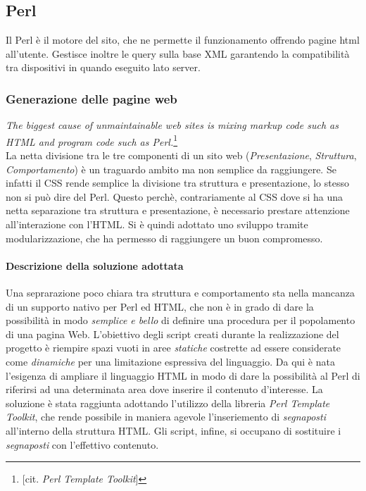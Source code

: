 \subsection{Perl}
Il Perl \`e il motore del sito, che ne permette il funzionamento offrendo pagine html all'utente. Gestisce inoltre le query sulla base XML garantendo la compatibilit\`a tra dispositivi in quando eseguito lato server.
\subsubsection{Generazione delle pagine web}
\textit{The biggest cause of unmaintainable web sites is mixing markup code such as HTML and program code such as Perl.}\footnote{[cit. \textit{Perl Template Toolkit}]}\\

La netta divisione tra le tre componenti di un sito web (\textit{Presentazione}, \textit{Struttura}, \textit{Comportamento}) \`e un traguardo ambito ma non semplice da raggiungere. Se infatti il CSS rende semplice la divisione tra struttura e presentazione, lo stesso non si pu\`o dire del Perl. Questo perch\`e, contrariamente al CSS dove si ha una netta separazione tra struttura e presentazione, \`e necessario prestare attenzione all'interazione con l'HTML. Si \`e quindi adottato uno sviluppo tramite modularizzazione, che ha permesso di raggiungere un buon compromesso.

\paragraph*{Descrizione della soluzione adottata}Una seprarazione poco chiara tra struttura e comportamento sta nella mancanza di un supporto nativo per Perl ed HTML, che non è in grado di dare la possibilit\`a in modo \textit{semplice e bello} di definire una procedura per il popolamento di una pagina Web. L'obiettivo degli script creati durante la realizzazione del progetto \`e riempire spazi vuoti in aree \textit{statiche} costrette ad essere considerate come \textit{dinamiche} per una limitazione espressiva del linguaggio. Da qui \`e nata l'esigenza di ampliare il linguaggio HTML in modo di dare la possibilit\`a al Perl di riferirsi ad una determinata area dove inserire il contenuto d'interesse. La soluzione \`e stata raggiunta adottando l'utilizzo della libreria \textit{Perl Template Toolkit}, che rende possibile in maniera agevole l'inseriemento di \textit{segnaposti} all'interno della struttura HTML. Gli script, infine, si occupano di sostituire i \textit{segnaposti} con l'effettivo contenuto.
